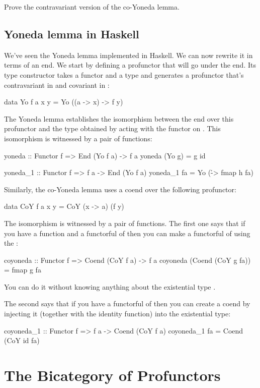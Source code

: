\documentclass[DaoFP]{subfiles}
\begin{document}
\begin{exercise}
Prove the contravariant version of the co-Yoneda lemma.
\end{exercise}

\subsection{Yoneda lemma in Haskell}

We've seen the Yoneda lemma implemented in Haskell. We can now rewrite it in terms of an end. We start by defining a profunctor that will go under the end. Its type constructor takes a functor  and a type  and generates a profunctor that's contravariant in  and covariant in :
\begin{haskell}
data Yo f a x y = Yo ((a -> x) -> f y)
\end{haskell}
The Yoneda lemma establishes the isomorphism between the end over this profunctor and the type obtained by acting with the functor   on . This isomorphism is witnessed by a pair of functions:
\begin{haskell}
yoneda :: Functor f => End (Yo f a) -> f a
yoneda (Yo g) = g id

yoneda_1 :: Functor f => f a -> End (Yo f a)
yoneda_1 fa = Yo (\h -> fmap h fa)
\end{haskell}

Similarly, the co-Yoneda lemma uses a coend over the following profunctor:
\begin{haskell}
data CoY f a x y = CoY (x -> a) (f y)
\end{haskell}
The isomorphism is witnessed by a pair of functions. The first one says that if you have a function  and a functorful of  then you can make a functorful of  using the :
\begin{haskell}
coyoneda :: Functor f => Coend (CoY f a) -> f a
coyoneda (Coend (CoY g fa)) = fmap g fa
\end{haskell}
You can do it without knowing anything about the existential type .

The second says that if you have a functorful of  then you can create a coend by injecting it (together with the identity function) into the existential type:
\begin{haskell}
coyoneda_1 :: Functor f => f a -> Coend (CoY f a)
coyoneda_1 fa = Coend (CoY id fa)
\end{haskell}


\section{The Bicategory of Profunctors}
\end{document}

